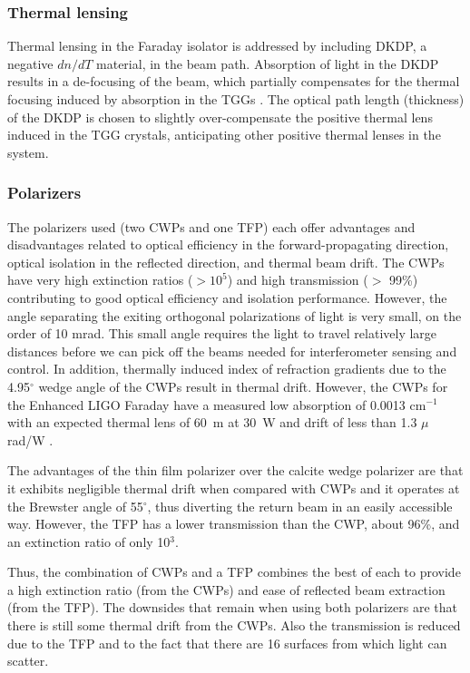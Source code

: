 \subsubsection{Thermal lensing}  
Thermal lensing in the Faraday isolator is addressed by including
DKDP, a negative $dn/dT$ material, in the beam path. Absorption of
light in the DKDP results in a de-focusing of the beam, which
partially compensates for the thermal focusing induced by absorption
in the TGGs \citep{Mueller2002Method, Khazanov2004Compensation}.  The
optical path length (thickness) of the DKDP is chosen to slightly
over-compensate the positive thermal lens induced in the TGG crystals,
anticipating other positive thermal lenses in the system.

\subsubsection{Polarizers}  
The polarizers used (two CWPs and one TFP) each offer advantages and
disadvantages related to optical efficiency in the forward-propagating
direction, optical isolation in the reflected direction, and thermal
beam drift. The CWPs have very high extinction ratios ($>10^5$) and
high transmission ($>$ 99\%) contributing to good optical efficiency
and isolation performance. However, the angle separating the exiting
orthogonal polarizations of light is very small, on the order of 10
mrad. This small angle requires the light to travel relatively large distances
before we can pick off the beams
needed for interferometer sensing and control. In addition, thermally
induced index of refraction gradients due to the 4.95$^{\circ}$ wedge
angle of the CWPs result in thermal drift. However, the CWPs for the
Enhanced LIGO Faraday have a measured low absorption of 0.0013
cm$^{-1}$
with an expected thermal lens of 60~m at 30~W and drift of less than
1.3 $\mu$rad/W \citep{UFLIGOGroup2006Upgrading}.

The advantages of the thin film polarizer over the calcite wedge
polarizer are that it exhibits negligible thermal drift when compared
with CWPs and it operates at the Brewster angle of 55$^\circ$, thus
diverting the return beam in an easily accessible way. However, the
TFP has a lower transmission than the CWP, about 96\%, and an
extinction ratio of only 10$^3$.

Thus, the combination of CWPs and a TFP combines the best of each to
provide a high extinction ratio (from the CWPs) and ease of reflected
beam extraction (from the TFP). The downsides that remain when using
both polarizers are that there is still some thermal drift from the
CWPs. Also the transmission is reduced due to the TFP and to the fact
that there are 16 surfaces from which light can scatter.

